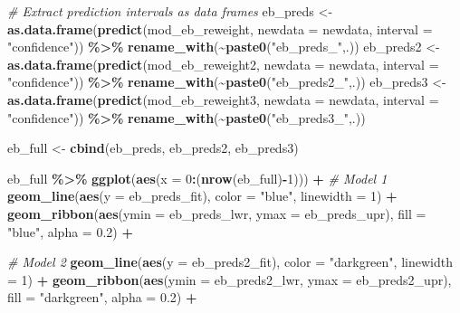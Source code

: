 \documentclass[
]{article}
\newenvironment{Shaded}{\begin{snugshade}}{\end{snugshade}}
\newcommand{\AttributeTok}[1]{\textcolor[rgb]{0.13,0.29,0.53}{#1}}
\newcommand{\CommentTok}[1]{\textcolor[rgb]{0.56,0.35,0.01}{\textit{#1}}}
\newcommand{\DecValTok}[1]{\textcolor[rgb]{0.00,0.00,0.81}{#1}}
\newcommand{\FloatTok}[1]{\textcolor[rgb]{0.00,0.00,0.81}{#1}}
\newcommand{\FunctionTok}[1]{\textcolor[rgb]{0.13,0.29,0.53}{\textbf{#1}}}
\newcommand{\NormalTok}[1]{#1}
\newcommand{\OtherTok}[1]{\textcolor[rgb]{0.56,0.35,0.01}{#1}}
\newcommand{\SpecialCharTok}[1]{\textcolor[rgb]{0.81,0.36,0.00}{\textbf{#1}}}
\newcommand{\StringTok}[1]{\textcolor[rgb]{0.31,0.60,0.02}{#1}}
\begin{document}
\begin{Shaded}
\begin{Highlighting}[]
\CommentTok{\# Extract prediction intervals as data frames}
\NormalTok{eb\_preds  }\OtherTok{\textless{}{-}} \FunctionTok{as.data.frame}\NormalTok{(}\FunctionTok{predict}\NormalTok{(mod\_eb\_reweight,  }\AttributeTok{newdata =}\NormalTok{ newdata, }\AttributeTok{interval =} \StringTok{"confidence"}\NormalTok{)) }\SpecialCharTok{\%\textgreater{}\%} \FunctionTok{rename\_with}\NormalTok{(}\SpecialCharTok{\textasciitilde{}}\FunctionTok{paste0}\NormalTok{(}\StringTok{"eb\_preds\_"}\NormalTok{,.))}
\NormalTok{eb\_preds2 }\OtherTok{\textless{}{-}} \FunctionTok{as.data.frame}\NormalTok{(}\FunctionTok{predict}\NormalTok{(mod\_eb\_reweight2, }\AttributeTok{newdata =}\NormalTok{ newdata, }\AttributeTok{interval =} \StringTok{"confidence"}\NormalTok{)) }\SpecialCharTok{\%\textgreater{}\%} \FunctionTok{rename\_with}\NormalTok{(}\SpecialCharTok{\textasciitilde{}}\FunctionTok{paste0}\NormalTok{(}\StringTok{"eb\_preds2\_"}\NormalTok{,.))}
\NormalTok{eb\_preds3 }\OtherTok{\textless{}{-}} \FunctionTok{as.data.frame}\NormalTok{(}\FunctionTok{predict}\NormalTok{(mod\_eb\_reweight3, }\AttributeTok{newdata =}\NormalTok{ newdata, }\AttributeTok{interval =} \StringTok{"confidence"}\NormalTok{)) }\SpecialCharTok{\%\textgreater{}\%} \FunctionTok{rename\_with}\NormalTok{(}\SpecialCharTok{\textasciitilde{}}\FunctionTok{paste0}\NormalTok{(}\StringTok{"eb\_preds3\_"}\NormalTok{,.))}

\NormalTok{eb\_full }\OtherTok{\textless{}{-}} \FunctionTok{cbind}\NormalTok{(eb\_preds, eb\_preds2, eb\_preds3)}

\NormalTok{eb\_full }\SpecialCharTok{\%\textgreater{}\%} 
  \FunctionTok{ggplot}\NormalTok{(}\FunctionTok{aes}\NormalTok{(}\AttributeTok{x =} \DecValTok{0}\SpecialCharTok{:}\NormalTok{(}\FunctionTok{nrow}\NormalTok{(eb\_full)}\SpecialCharTok{{-}}\DecValTok{1}\NormalTok{))) }\SpecialCharTok{+}
    \CommentTok{\# Model 1}
    \FunctionTok{geom\_line}\NormalTok{(}\FunctionTok{aes}\NormalTok{(}\AttributeTok{y =}\NormalTok{ eb\_preds\_fit), }\AttributeTok{color =} \StringTok{"blue"}\NormalTok{, }\AttributeTok{linewidth =} \DecValTok{1}\NormalTok{) }\SpecialCharTok{+}
    \FunctionTok{geom\_ribbon}\NormalTok{(}\FunctionTok{aes}\NormalTok{(}\AttributeTok{ymin =}\NormalTok{ eb\_preds\_lwr, }\AttributeTok{ymax =}\NormalTok{ eb\_preds\_upr), }\AttributeTok{fill =} \StringTok{"blue"}\NormalTok{, }\AttributeTok{alpha =} \FloatTok{0.2}\NormalTok{) }\SpecialCharTok{+}
  
    \CommentTok{\# Model 2}
    \FunctionTok{geom\_line}\NormalTok{(}\FunctionTok{aes}\NormalTok{(}\AttributeTok{y =}\NormalTok{ eb\_preds2\_fit), }\AttributeTok{color =} \StringTok{"darkgreen"}\NormalTok{, }\AttributeTok{linewidth =} \DecValTok{1}\NormalTok{) }\SpecialCharTok{+}
    \FunctionTok{geom\_ribbon}\NormalTok{(}\FunctionTok{aes}\NormalTok{(}\AttributeTok{ymin =}\NormalTok{ eb\_preds2\_lwr, }\AttributeTok{ymax =}\NormalTok{ eb\_preds2\_upr), }\AttributeTok{fill =} \StringTok{"darkgreen"}\NormalTok{, }\AttributeTok{alpha =} \FloatTok{0.2}\NormalTok{) }\SpecialCharTok{+}
  

\end{Highlighting}
\end{Shaded}
\end{document}
